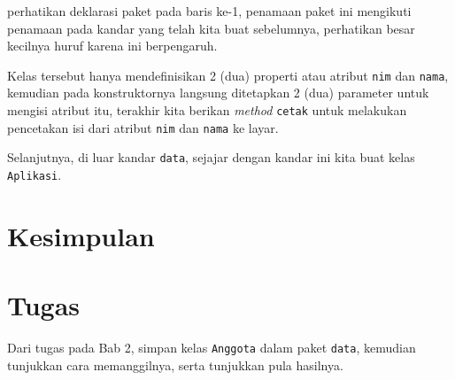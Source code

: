 perhatikan deklarasi paket pada baris ke-1, penamaan paket ini mengikuti penamaan pada kandar yang telah kita buat sebelumnya, perhatikan besar kecilnya huruf karena ini berpengaruh.

Kelas tersebut hanya mendefinisikan 2 (dua) properti atau atribut \texttt{nim} dan \texttt{nama}, kemudian pada konstruktornya langsung ditetapkan 2 (dua) parameter untuk mengisi atribut itu, terakhir kita berikan \textit{method} \texttt{cetak} untuk melakukan pencetakan isi dari atribut \texttt{nim} dan \texttt{nama} ke layar.

Selanjutnya, di luar kandar \texttt{data}, sejajar dengan kandar ini kita buat kelas \texttt{Aplikasi}.

\section{Kesimpulan}

\section{Tugas}

Dari tugas pada Bab 2, simpan kelas \texttt{Anggota} dalam paket \texttt{data}, kemudian tunjukkan cara memanggilnya, serta tunjukkan pula hasilnya.